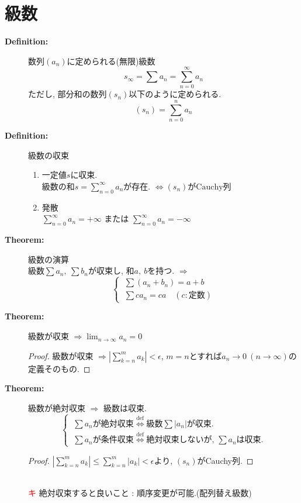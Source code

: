 \documentclass[dvipdfmx]{jsarticle}
\newcommand{\point}{\textcircled{\textcolor{red}{\scriptsize キ}} }
\begin{document}
\section{級数}
\begin{description}
    \item[\bf{Definition:}] 数列$(a_n)$に定められる(無限)級数
        $$ s_{\infty} = \sum a_n = \sum_{n=0}^{\infty} a_n $$
        ただし, 部分和の数列$(s_n)$以下のように定められる.
        $$(s_n) =  \sum_{n=0}^{n} a_n$$
        
    \item[\bf{Definition:}] 級数の収束
        \begin{enumerate}
            \item 一定値$s$に収束. \\
                級数の和$\displaystyle s=\sum_{n=0}^{\infty} a_n$が存在. $\Leftrightarrow (s_n)\text{がCauchy列}$

            \item 発散 \\
                $\displaystyle \sum_{n=0}^{\infty} a_n = + \infty$ または $\displaystyle \sum_{n=0}^{\infty} a_n = - \infty$ 
        \end{enumerate}

    \item[\bf{Theorem:}] 級数の演算 \\
        級数$\sum a_n,\ \sum b_n$が収束し, 和$a,\ b$を持つ. $\Rightarrow$
        $$\begin{cases} \ \sum \left( a_{n}+b_{n}\right) =a+b \\ \ \sum ca_{n}=ca \quad (c : \text{定数})\end{cases}$$

    \item[\bf{Theorem:}] 級数が収束 $\Rightarrow \displaystyle \lim_{n \to \infty} a_n = 0$ \\
        \begin{proof}
            級数が収束 $\Rightarrow \displaystyle {|\sum_{k=n}^m a_k|} < \epsilon$, $m=n$とすれば$a_n \rightarrow 0 \ (n \to \infty)$の定義そのもの.
        \end{proof}

    \item[\bf{Theorem:}] 級数が絶対収束 $\Rightarrow$ 級数は収束. \\
        $$ \begin{cases}
            \ \sum a_n \text{が絶対収束} \overset{\mathrm{def}}{\Leftrightarrow} \text{級数}\sum |a_n|\text{が収束.} \\
            \ \sum a_n \text{が条件収束} \overset{\mathrm{def}}{\Leftrightarrow} \text{絶対収束しないが, }\sum a_n\text{は収束.}
        \end{cases} $$
        \begin{proof}
            $\displaystyle |\sum_{k=n}^m a_k| \leq \sum_{k=n}^m |a_k| < \epsilon$より, $(s_n)$がCauchy列.
        \end{proof} \\
        \point 絶対収束すると良いこと : 順序変更が可能.(配列替え級数)
    

\end{description}
\end{document}
